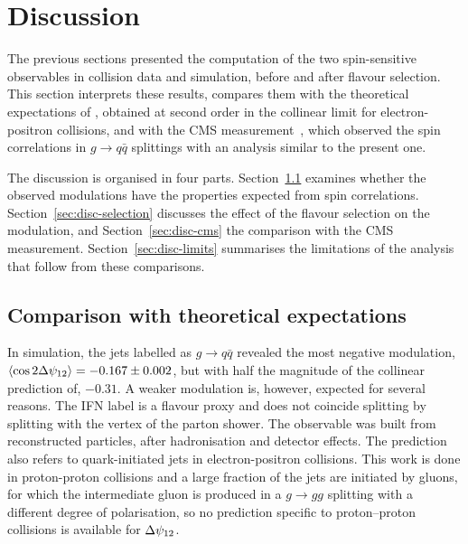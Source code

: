 \section{Discussion}
\label{sec:res-discussion}

The previous sections presented the computation of the two spin-sensitive
observables in collision data and simulation, before and after flavour selection.
This section interprets these results, compares them with the theoretical
expectations of \cite{Karlberg_2021}, obtained at second order in the
collinear limit for electron-positron collisions, and with the CMS
measurement~\cite{CMS:2026jnt}, which observed the spin correlations in
$g \to q\bar{q}$ splittings with an analysis similar to the present one. 

The discussion is organised in four parts. Section~\ref{sec:disc-theory} examines
whether the observed modulations have the properties expected from spin
correlations. Section~\ref{sec:disc-selection} discusses the effect of the flavour
selection on the modulation, and Section~\ref{sec:disc-cms} the comparison with
the CMS measurement. Section~\ref{sec:disc-limits} summarises the limitations of
the analysis that follow from these comparisons.

\subsection{Comparison with theoretical expectations}
\label{sec:disc-theory}

In simulation, the jets labelled as $g \to q\bar{q}$ revealed the most negative modulation,
$\langle \cos 2\Delta\psi_{12} \rangle = -0.167 \pm 0.002$, but with half the magnitude of the collinear prediction of, $-0.31$. 
A weaker modulation is, however, expected 
for several reasons. The IFN label is a flavour proxy and does not
coincide splitting by splitting with the vertex of the parton shower.
The observable was built from reconstructed particles, after hadronisation and detector effects.
The prediction also refers to quark-initiated jets in electron-positron collisions. This
work is done in proton-proton collisions and a large fraction of the jets are initiated by gluons,
for which the intermediate gluon is produced in a
$g \to gg$ splitting with a different degree of polarisation, so no prediction
specific to proton--proton collisions is available for $\Delta\psi_{12}$.

